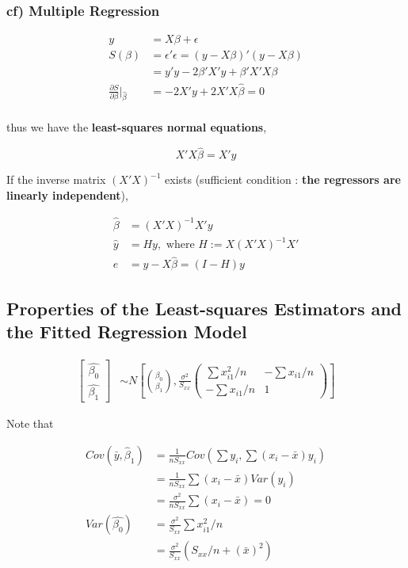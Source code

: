 \documentclass[12pt]{article}
\begin{document}
\subsubsection*{cf) Multiple Regression}

$$
\begin{aligned}
y &= X\beta + \epsilon \\[8pt]
S(\beta) &= \epsilon' \epsilon = (y - X\beta)' (y - X\beta) \\[8pt]
&= y'y - 2\beta'X'y + \beta' X'X\beta \\[8pt]
\frac{\partial S}{\partial \beta} \Bigg|_{\hat{\beta}} &= -2X'y + 2X'X\hat{\beta} = 0 \\[8pt]
\end{aligned}
$$

thus we have the \textbf{least-squares normal equations},

$$
X'X \hat{\beta} = X'y
$$

If the inverse matrix $(X'X)^{-1}$ exists (sufficient condition : \textbf{the regressors are linearly independent}),

$$
\begin{aligned}
\hat{\beta} &= (X'X)^{-1} X'y \\[8pt]
\hat{y} &= Hy, \text{ where } H:=X(X'X)^{-1}X'\\[8pt]
e &= y - X\hat{\beta} = (I-H)y
\end{aligned}
$$




\subsection{Properties of the Least-squares Estimators and the Fitted Regression Model} 

$$
\begin{aligned}
\begin{bmatrix} \hat{\beta_0} \\ \hat{\beta_1} \end{bmatrix} &\sim N \left[ \binom{\beta_0}{\beta_1}, \frac{\sigma^2}{S_{xx}} \begin{pmatrix}  \sum x_{i1}^2 /n & - \sum x_{i1}/n \\ - \sum x_{i1}/n & 1  \end{pmatrix} \right] 
\end{aligned}
$$

Note that 

$$
\begin{aligned}
Cov(\bar{y}, \hat{\beta}_1) &= \frac{1}{n S_{xx} } Cov (\sum y_i, \sum (x_i - \bar{x})y_i) \\[8pt]
&= \frac{1}{n S_{xx} } \sum (x_i - \bar{x}) Var(y_i) \\[8pt]
&= \frac{\sigma^2}{n S_{xx}} \sum (x_i - \bar{x} ) = 0 \\[10pt]
Var(\hat{\beta_0}) &= \frac{\sigma^2}{S_{xx}} \sum x_{i1}^2 /n \\[8pt]
&= \frac{\sigma^2}{S_{xx}} \left( S_{xx}/n + (\bar{x})^2 \right)
\end{aligned}
$$
\end{document}
